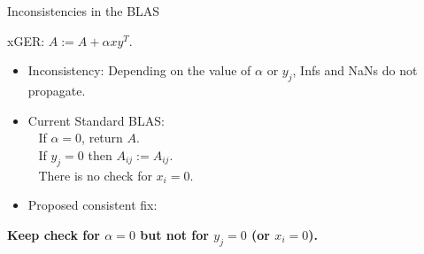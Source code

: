 \documentclass[11pt]{beamer}
\begin{document}
\begin{frame}{Inconsistencies in the BLAS}

	xGER: $A := A + \alpha x y^T$.
	\begin{itemize}
		\item Inconsistency: Depending on the value of $\alpha$ or $y_j$, Infs and NaNs do not propagate.
		\item Current Standard BLAS:\\
		~ If $\alpha = 0$, return $A$.\\
		~ If $y_j = 0$ then $A_{ij} := A_{ij}$.\\
		~ There is no check for $x_i = 0$.
		\item Proposed consistent fix: 
	\end{itemize}

	\begin{center}
		\textbf{Keep check for $\alpha = 0$ but not for $y_j = 0$ (or $x_i = 0$).}
	\end{center}


\end{frame}
\end{document}

